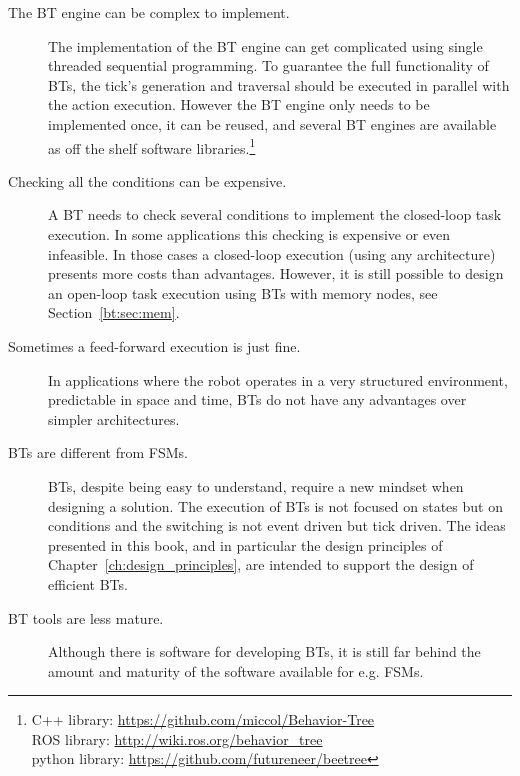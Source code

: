 \begin{description}
\item [The BT engine can be complex to implement.] The implementation of the BT engine can get complicated using single threaded sequential programming. To guarantee the full functionality of BTs, the tick's generation and traversal should be executed in parallel with the action execution. However the
BT engine only needs to be implemented once, it can be reused, and several BT engines are available as off the shelf software libraries.\footnote{C++ library: \url{https://github.com/miccol/Behavior-Tree} \\ ROS library: \url{http://wiki.ros.org/behavior_tree} \\ 
python library: \url{https://github.com/futureneer/beetree}}
\item [Checking all the conditions can be expensive.] A BT needs to check several conditions to implement the closed-loop task execution. In some applications this checking is expensive or even infeasible. In those cases a closed-loop execution (using any architecture) presents more costs than advantages. However, it is still possible to design an open-loop task execution using BTs with memory nodes, see Section~\ref{bt:sec:mem}. 
\item [Sometimes a feed-forward execution is just fine.] In  applications where the robot operates in a very structured environment, predictable in space and time, BTs do not have any advantages over simpler architectures.
\item [BTs are different from FSMs.] BTs, despite being easy to understand, require a new mindset when designing a solution. The execution of BTs is not focused on states but on conditions and the switching is not event driven but tick driven. 
The ideas presented in this book, and in particular the design principles of Chapter~\ref{ch:design_principles}, are intended to support the design of efficient BTs.
\item [BT tools are less mature.] Although there is software for developing BTs, it is still far behind the amount and maturity of the software available for e.g. FSMs.
\end{description}
